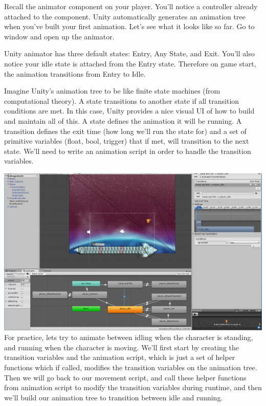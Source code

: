 \documentclass[12pt]{article}
\begin{document}
Recall the animator component on your player. You'll notice a controller already attached to the component. Unity automatically generates an animation tree when you've built your first animation. Let's see what it looks like so far. Go to window and open up the animator. 

Unity animator has three default states: Entry, Any State, and Exit. You'll also notice your idle state is attached from the Entry state. Therefore on game start, the animation transitions from Entry to Idle. 

Imagine Unity's animation tree to be like finite state machines (from computational theory). A state transitions to another state if all transition conditions are met. In this case, Unity provides a nice visual UI of how to build and maintain all of this. A state defines the animation it will be running. A transition defines the exit time (how long we'll run the state for) and a set of primitive variables (float, bool, trigger) that if met, will transition to the next state. We'll need to write an animation script in order to handle the transition variables.

\includegraphics[scale=0.4]{Figure0431} \\

For practice, lets try to animate between idling when the character is standing, and running when the character is moving. We'll first start by creating the transition variables and the animation script, which is just a set of helper functions which if called, modifies the transition variables on the animation tree. Then we will go back to our movement script, and call these helper functions from animation script to modify the transition variables during runtime, and then we'll build our animation tree to transition between idle and running.
\end{document}
